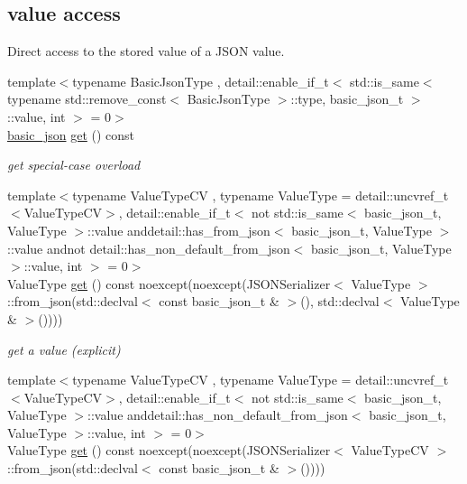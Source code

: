 \subsection*{value access}
\label{_amgrpd8f53c9caf18314e5b3f758245606995}%
Direct access to the stored value of a J\+S\+ON value. \begin{DoxyCompactItemize}
\item 
{\footnotesize template$<$typename Basic\+Json\+Type , detail\+::enable\+\_\+if\+\_\+t$<$ std\+::is\+\_\+same$<$ typename std\+::remove\+\_\+const$<$ Basic\+Json\+Type $>$\+::type, basic\+\_\+json\+\_\+t $>$\+::value, int $>$  = 0$>$ }\\\hyperlink{classnlohmann_1_1basic__json}{basic\+\_\+json} \hyperlink{classnlohmann_1_1basic__json_ac41d1fda870c3f3c4ead932c2e3ab61f}{get} () const 
\begin{DoxyCompactList}\small\item\em get special-\/case overload \end{DoxyCompactList}\item 
{\footnotesize template$<$typename Value\+Type\+CV , typename Value\+Type  = detail\+::uncvref\+\_\+t$<$\+Value\+Type\+C\+V$>$, detail\+::enable\+\_\+if\+\_\+t$<$ not std\+::is\+\_\+same$<$ basic\+\_\+json\+\_\+t, Value\+Type $>$\+::value anddetail\+::has\+\_\+from\+\_\+json$<$ basic\+\_\+json\+\_\+t, Value\+Type $>$\+::value andnot detail\+::has\+\_\+non\+\_\+default\+\_\+from\+\_\+json$<$ basic\+\_\+json\+\_\+t, Value\+Type $>$\+::value, int $>$  = 0$>$ }\\Value\+Type \hyperlink{classnlohmann_1_1basic__json_aa6602bb24022183ab989439e19345d08}{get} () const noexcept(noexcept(J\+S\+O\+N\+Serializer$<$ Value\+Type $>$\+::from\+\_\+json(std\+::declval$<$ const basic\+\_\+json\+\_\+t \& $>$(), std\+::declval$<$ Value\+Type \& $>$())))
\begin{DoxyCompactList}\small\item\em get a value (explicit) \end{DoxyCompactList}\item 
{\footnotesize template$<$typename Value\+Type\+CV , typename Value\+Type  = detail\+::uncvref\+\_\+t$<$\+Value\+Type\+C\+V$>$, detail\+::enable\+\_\+if\+\_\+t$<$ not std\+::is\+\_\+same$<$ basic\+\_\+json\+\_\+t, Value\+Type $>$\+::value anddetail\+::has\+\_\+non\+\_\+default\+\_\+from\+\_\+json$<$ basic\+\_\+json\+\_\+t, Value\+Type $>$\+::value, int $>$  = 0$>$ }\\Value\+Type \hyperlink{classnlohmann_1_1basic__json_a5afa21d477e13fa7a3dcd7ea66c48b52}{get} () const noexcept(noexcept(J\+S\+O\+N\+Serializer$<$ Value\+Type\+CV $>$\+::from\+\_\+json(std\+::declval$<$ const basic\+\_\+json\+\_\+t \& $>$())))

\end{DoxyCompactItemize}
